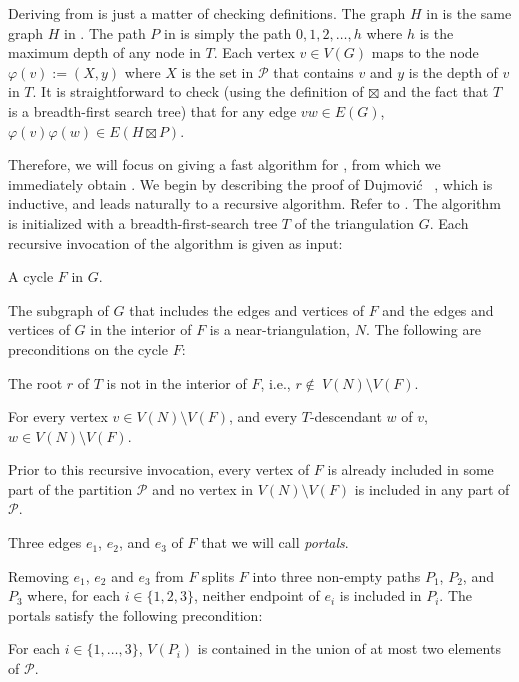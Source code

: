 \documentclass[kpfonts]{patmorin}
\begin{document}
Deriving  from  is just a matter of checking definitions.  The graph $H$ in  is the same graph $H$ in . The path $P$ in  is simply the path $0,1,2,\ldots,h$ where $h$ is the maximum depth of any node in $T$.  Each vertex $v\in V(G)$ maps to the node $\varphi(v):=(X,y)$ where $X$ is the set in $\mathcal{P}$ that contains $v$ and $y$ is the depth of $v$ in $T$.  It is straightforward to check (using the definition of $\boxtimes$ and the fact that $T$ is a breadth-first search tree) that for any  edge $vw\in E(G)$, $\varphi(v)\varphi(w)\in E(H\boxtimes P)$.

Therefore, we will focus on giving a fast algorithm for , from which we immediately obtain .  We begin by describing the proof of Dujmović \etal\  \cite{dujmovic.joret.ea:planar}, which is inductive, and leads naturally to a recursive algorithm.  Refer to . The algorithm is initialized with a breadth-first-search tree $T$ of the triangulation $G$.  Each recursive invocation of the algorithm is given as input:
\begin{compactenum}
  \item A cycle $F$ in $G$.

  The subgraph of $G$ that includes the edges and vertices of $F$ and the edges and vertices of $G$ in the interior of $F$ is a near-triangulation, $N$.  The following are preconditions on the cycle $F$:
  \begin{compactenum}[(P1)]
    \item The root $r$ of $T$ is not in the interior of $F$, i.e., $r\not\in\ V(N)\setminus V(F)$.
    \item For every vertex $v\in V(N)\setminus V(F)$, and every $T$-descendant $w$ of $v$, $w\in V(N)\setminus V(F)$.
    \item Prior to this recursive invocation, every vertex of $F$ is already included in some part of the partition $\mathcal{P}$ and no vertex in $V(N)\setminus V(F)$ is included in any part of $\mathcal{P}$.
  \end{compactenum}
  \item Three edges $e_1$, $e_2$, and $e_3$ of $F$ that we will call \emph{portals}.

  Removing $e_1$, $e_2$ and $e_3$ from $F$ splits $F$ into three non-empty paths $P_1$, $P_2$, and $P_3$ where, for each $i\in\{1,2,3\}$, neither endpoint of $e_i$ is included in $P_i$.  The portals satisfy the following precondition:
  \begin{compactenum}[(P1)]\setcounter{enumii}{3}
    \item For each $i\in\{1,\ldots,3\}$, $V(P_i)$ is contained in the union of at most two elements of $\mathcal{P}$.
  \end{compactenum}

\end{compactenum}
\end{document}
